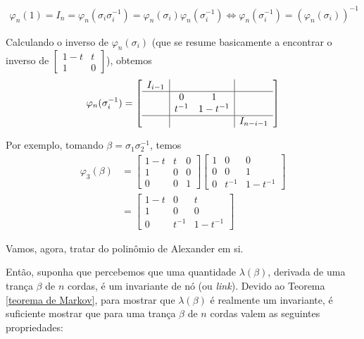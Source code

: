 \documentclass[a4paper,portuguese,11pt,twoside, leqno]{book}
\theoremstyle{definition}
\begin{document}
	\begin{align*}
	\varphi_n(1) = I_n = \varphi_n(\sigma_i\sigma_i^{-1}) = \varphi_n(\sigma_i)\varphi_n(\sigma_i^{-1}) \Leftrightarrow \varphi_n(\sigma_i^{-1}) = (\varphi_n(\sigma_i))^{-1}
	\end{align*} 
	\par\vspace{0.3cm} Calculando o inverso de $\varphi_n(\sigma_i)$ (que se resume basicamente a encontrar o inverso de $\left[\begin{smallmatrix}
	1-t & t\\
	1 & 0
	\end{smallmatrix}\right]$), obtemos
	\begin{align*}
	\varphi_n(\sigma_i^{-1}) = 
	\left[ 
	\begin{array}{c|cc|c}
	I_{i-1} &  &  & \\
	\hline 
	& 0 & 1 &  \\
	& t^{-1} & 1-t^{-1} &  \\ 
	\hline
	&  &  & I_{n-i-1}
	\end{array}
	\right] 
	\end{align*}
	\par\vspace{0.3cm} Por exemplo, tomando $\beta = \sigma_1\sigma_2^{-1}$, temos
	\begin{align*}
	\varphi_3(\beta) &= 
	\begin{bmatrix}
	1-t & t & 0 \\
	1 & 0 & 0 \\
	0 & 0 & 1
	\end{bmatrix}\begin{bmatrix}
	1 & 0 & 0 \\
	0 & 0 & 1 \\
	0 & t^{-1} & 1-t^{-1}
	\end{bmatrix}\\
	&= \begin{bmatrix}
	1-t & 0 & t \\
	1 & 0 & 0 \\
	0 & t^{-1} & 1-t^{-1}
	\end{bmatrix}
	\end{align*}
	\par\vspace{0.3cm} Vamos, agora, tratar do polinômio de Alexander em si.
	\par\vspace{0.3cm} Então, suponha que percebemos que uma quantidade $\lambda(\beta)$, derivada de uma trança $\beta$ de $n$ cordas, é um invariante de nó (ou \textit{link}). Devido ao Teorema \eqref{teorema de Markov}, para mostrar que $\lambda(\beta)$ é realmente um invariante, é suficiente mostrar que para uma trança $\beta$ de $n$ cordas valem as seguintes propriedades:
\end{document}
